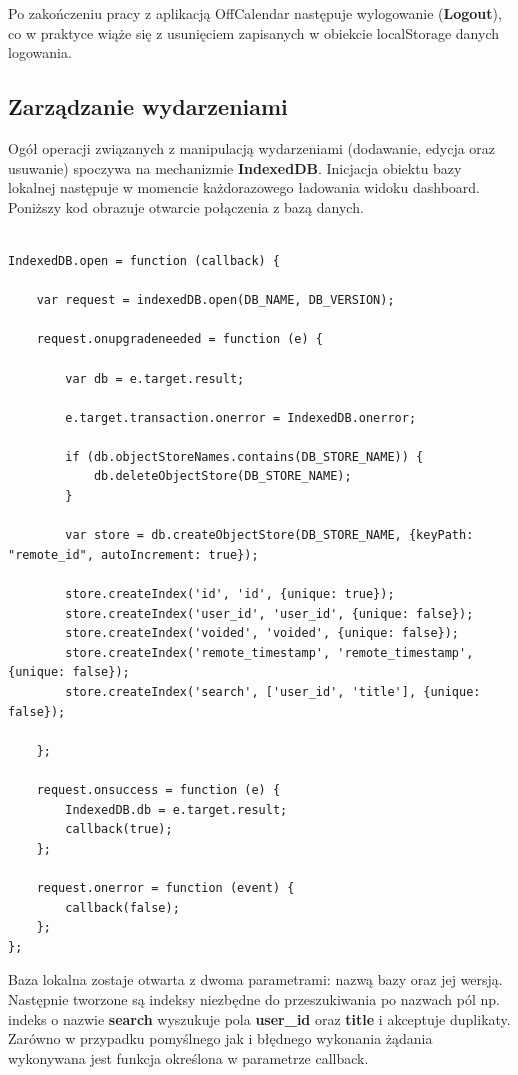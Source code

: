 Po zakończeniu pracy z aplikacją OffCalendar następuje wylogowanie (\textbf{Logout}), co w praktyce wiąże się z usunięciem zapisanych w obiekcie localStorage danych logowania.

\subsection{Zarządzanie wydarzeniami}
\label{sec:zarzWyd}

Ogół operacji związanych z manipulacją wydarzeniami (dodawanie, edycja oraz usuwanie) spoczywa na mechanizmie \textbf{IndexedDB}. Inicjacja obiektu bazy lokalnej następuje w momencie każdorazowego ładowania widoku dashboard. Poniższy kod obrazuje otwarcie połączenia z bazą danych.

\begin{lstlisting}[caption=Otwarcie połączenia z lokalną bazą danych., label=amb, captionpos=b]

IndexedDB.open = function (callback) {

    var request = indexedDB.open(DB_NAME, DB_VERSION);

    request.onupgradeneeded = function (e) {

        var db = e.target.result;

        e.target.transaction.onerror = IndexedDB.onerror;

        if (db.objectStoreNames.contains(DB_STORE_NAME)) {
            db.deleteObjectStore(DB_STORE_NAME);
        }

        var store = db.createObjectStore(DB_STORE_NAME, {keyPath: "remote_id", autoIncrement: true});

        store.createIndex('id', 'id', {unique: true});
        store.createIndex('user_id', 'user_id', {unique: false});
        store.createIndex('voided', 'voided', {unique: false});
        store.createIndex('remote_timestamp', 'remote_timestamp', {unique: false});
        store.createIndex('search', ['user_id', 'title'], {unique: false});

    };

    request.onsuccess = function (e) {
        IndexedDB.db = e.target.result;
        callback(true);
    };

    request.onerror = function (event) {
        callback(false);
    };
};

\end{lstlisting}

Baza lokalna zostaje otwarta z dwoma parametrami: nazwą bazy oraz jej wersją. Następnie tworzone są indeksy niezbędne do przeszukiwania po nazwach pól np. indeks o nazwie \textbf{search} wyszukuje pola \textbf{user\_id} oraz \textbf{title} i akceptuje duplikaty. Zarówno w przypadku pomyślnego jak i błędnego wykonania żądania wykonywana jest funkcja określona w parametrze callback. 

